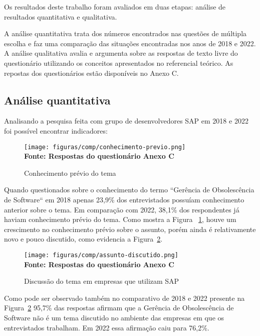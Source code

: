 Os resultados deste trabalho foram avaliados em duas etapas: análise de resultados quantitativa e qualitativa.

A análise quantitativa trata dos números encontrados nas questões de múltipla escolha e faz uma comparação das situações encontradas nos anos de 2018 e 2022. A análise qualitativa avalia e argumenta sobre as respostas de texto livre do questionário utilizando os conceitos apresentados no referencial teórico. As repostas dos questionários estão disponíveis no Anexo C.

\subsection{\esp Análise quantitativa }

Analisando a pesquisa feita com grupo de desenvolvedores SAP em 2018 e 2022 foi possível encontrar indicadores:

\begin{figure}[ht]
	\centering	
	\caption[\hspace{0.1cm}Q1.]{Conhecimento prévio do tema}
	\vspace{-0.4cm}
	\texttt{[image: figuras/comp/conhecimento-previo.png]}
	\vspace{-0.2cm}
	\\\textbf{\footnotesize Fonte: Respostas do questionário Anexo C }
	\label{fig:conhec}
\end{figure}

Quando questionados sobre o conhecimento do termo “Gerência de Obsolescência de Software“ em 2018 apenas 23,9\% dos entrevistados possuíam conhecimento anterior sobre o tema. Em comparação com 2022, 38,1\% dos respondentes já haviam conhecimento prévio do tema.
Como mostra a Figura ~\ref{fig:conhec}, houve um crescimento no conhecimento prévio sobre o assunto, porém ainda é relativamente novo e pouco discutido, como evidencia a Figura~\ref{fig:discu}.

\begin{figure}[ht]
	\centering	
	\caption[\hspace{0.1cm}Q1.]{Discussão do tema em empresas que utilizam SAP }
	\vspace{-0.4cm}
	\texttt{[image: figuras/comp/assunto-discutido.png]}
	\vspace{-0.2cm}
	\\\textbf{\footnotesize Fonte: Respostas do questionário Anexo C }
	\label{fig:discu}
\end{figure}
Como pode ser observado também  no comparativo de 2018 e 2022 presente na Figura~\ref{fig:discu} 95,7\% das respostas afirmam que a Gerência de Obsolescência de Software não é um tema discutido no ambiente das empresas em que os entrevistados trabalham. Em 2022 essa afirmação caiu para 76,2\%.

